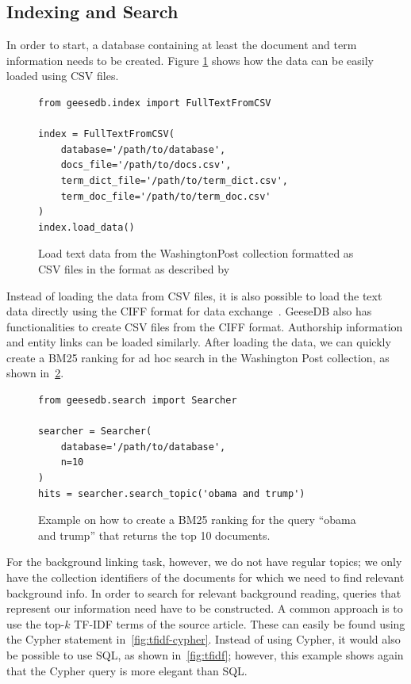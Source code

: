 \subsection{Indexing and Search}
In order to start, a database containing at least the document and term information needs to be created. Figure \ref{fig:load_text_data} shows how the data can be easily loaded using CSV files.
\begin{figure}
	\begin{verbatim}
from geesedb.index import FullTextFromCSV

index = FullTextFromCSV(
    database='/path/to/database',
    docs_file='/path/to/docs.csv',
    term_dict_file='/path/to/term_dict.csv',
    term_doc_file='/path/to/term_doc.csv'
)
index.load_data()
	\end{verbatim}
	\caption{Load text data from the WashingtonPost collection formatted as CSV files in the format as described by~\citet{OldDog}}
	\label{fig:load_text_data}
\end{figure}

Instead of loading the data from CSV files, it is also possible to load the text data directly using the CIFF format for data exchange~\citep{ciff}. GeeseDB also has functionalities to create CSV files from the CIFF format. Authorship information and entity links can be loaded similarly. After loading the data, we can quickly create a BM25 ranking for ad hoc search in the Washington Post collection, as shown in~\cref{fig:code_bm25_ranking}.

\begin{figure}
	\begin{verbatim}
from geesedb.search import Searcher

searcher = Searcher(
    database='/path/to/database', 
    n=10
)
hits = searcher.search_topic('obama and trump')
	\end{verbatim}
	\caption{Example on how to create a BM25 ranking for the query ``obama and trump'' that returns the top 10 documents.}
	\label{fig:code_bm25_ranking}
\end{figure}

For the background linking task, however, we do not have regular topics; we only have the collection identifiers of the documents for which we need to find relevant background info. In order to search for relevant background reading, queries that represent our information need have to be constructed. A common approach is to use the top-$k$ TF-IDF terms of the source article. These can easily be found using the Cypher statement in~\cref{fig:tfidf-cypher}. Instead of using Cypher, it would also be possible to use SQL, as shown in~\cref{fig:tfidf}; however, this example shows again that the Cypher query is more elegant than SQL. 

